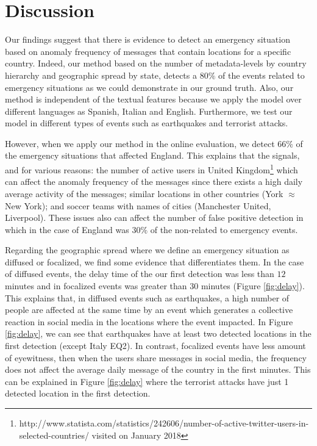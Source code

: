 \documentclass{llncs}
\begin{document}

\section{Discussion}

Our findings suggest that there is evidence to detect an emergency situation based on anomaly frequency of messages that contain locations for a specific country. Indeed, our method based on the number of metadata-levels by country hierarchy and geographic spread by state, detects a $80\%$ of the events related to emergency situations as we could demonstrate in our ground truth. Also, our method is independent of the textual features because we apply the model over different languages as Spanish, Italian and English. Furthermore, we test our model in different types of events such as earthquakes and terrorist attacks.

However, when we apply our method in the online evaluation, we detect $66\%$ of the emergency situations that affected England. This explains that the signals, and for various reasons: the number of active users in United Kingdom\footnote{http://www.statista.com/statistics/242606/number-of-active-twitter-users-in-selected-countries/ visited on January 2018} which can affect the anomaly frequency of the messages since there exists a high daily average activity of the messages; similar locations in other countries (York $\approx$ New York); and soccer teams with names of cities (Manchester United, Liverpool). These issues also can affect the number of false positive detection in which in the case of England was $30\%$ of the non-related to emergency events.

Regarding the geographic spread where we define an emergency situation as diffused or focalized, we find some evidence that differentiates them. In the case of diffused events, the delay time of the our first detection was less than $12$ minutes and in focalized events was greater than $30$ minutes (Figure \ref{fig:delay}). This explains that, in diffused events such as earthquakes, a high number of people are affected at the same time by an event which generates a collective reaction in social media in the locations where the event impacted. In Figure \ref{fig:delay}, we can see that earthquakes have at least two detected locations in the first detection (except Italy EQ2). In contrast, focalized events have less amount of eyewitness, then when the users share messages in social media, the frequency does not affect the average daily message of the country in the first minutes. This can be explained in Figure \ref{fig:delay} where the terrorist attacks have just 1 detected location in the first detection.
\end{document}
